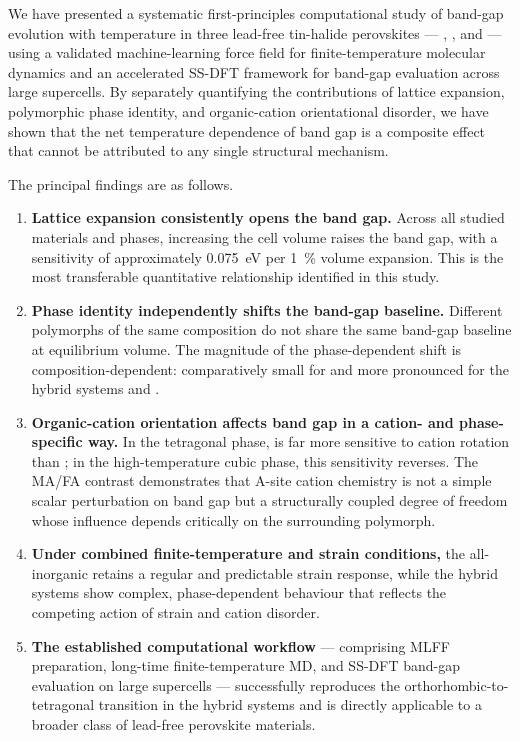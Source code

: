 We have presented a systematic first-principles computational study
of band-gap evolution with temperature in three lead-free tin-halide
perovskites --- \CsSnI{}, \FASnI{}, and \MASnI{} --- using a
validated machine-learning force field for finite-temperature
molecular dynamics and an accelerated SS-DFT framework for
band-gap evaluation across large supercells.
By separately quantifying the contributions of lattice expansion,
polymorphic phase identity, and organic-cation orientational disorder,
we have shown that the net temperature dependence of band gap is
a composite effect that cannot be attributed to any single structural
mechanism.

The principal findings are as follows.

\begin{enumerate}
  \item \textbf{Lattice expansion consistently opens the band gap.}
        Across all studied materials and phases, increasing the cell
        volume raises the band gap, with a sensitivity of
        approximately \SI{0.075}{eV} per \SI{1}{\percent} volume
        expansion.
        This is the most transferable quantitative relationship
        identified in this study.

  \item \textbf{Phase identity independently shifts the band-gap baseline.}
        Different polymorphs of the same composition do not share
        the same band-gap baseline at equilibrium volume.
        The magnitude of the phase-dependent shift is
        composition-dependent: comparatively small for \CsSnI{} and
        more pronounced for the hybrid systems \FASnI{} and \MASnI{}.

  \item \textbf{Organic-cation orientation affects band gap in a
        cation- and phase-specific way.}
        In the tetragonal phase, \MASnI{} is far more sensitive to
        cation rotation than \FASnI{}; in the high-temperature cubic
        phase, this sensitivity reverses.
        The MA/FA contrast demonstrates that A-site cation chemistry
        is not a simple scalar perturbation on band gap but a
        structurally coupled degree of freedom whose influence depends
        critically on the surrounding polymorph.

  \item \textbf{Under combined finite-temperature and strain conditions,}
        the all-inorganic \CsSnI{} retains a regular and predictable
        strain response, while the hybrid systems show complex,
        phase-dependent behaviour that reflects the competing action
        of strain and cation disorder.

  \item \textbf{The established computational workflow} --- comprising
        MLFF preparation, long-time finite-temperature MD, and
        SS-DFT band-gap evaluation on large supercells ---
        successfully reproduces the orthorhombic-to-tetragonal
        transition in the hybrid systems and is directly applicable
        to a broader class of lead-free perovskite materials.
\end{enumerate}


